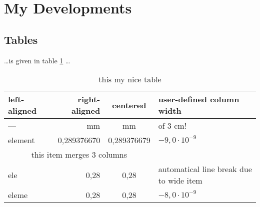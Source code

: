 \section{My Developments}
\subsection{Tables}
\dots is given in table \ref{table:1} \ldots
\begin{table}[h]
  \caption{this my nice table}
  \label{table:1}
  \begin{center}
  \begin{tabular}{@{}lrcp{3cm}}
  \toprule
    left-aligned & right-aligned & centered     & user-defined column width\\
  \midrule
    ---        & mm           & mm            & of 3 cm!\\
  \midrule
    element    & 0,289376670  &  0,289376679  & $-9,0 \cdot 10^{-9}$\\
    \multicolumn{3}{c}{this item merges 3 columns}\\
    ele        & 0,28         &  0,28         & automatical line break due to wide item\\
    eleme      & 0,28         &  0,28         & $-8,0 \cdot 10^{-9}$\\
  \bottomrule
  \end{tabular}
  \end{center}
\end{table}
